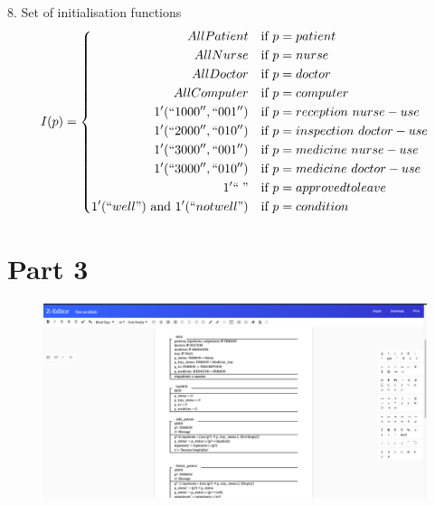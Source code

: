 \documentclass{article}
\begin{document}
8. Set of initialisation functions
$$  
I(p)=\left\{
\begin{aligned}
AllPatient \quad &\mbox{if}\ p=patient\\
AllNurse \quad &\mbox{if}\ p=nurse\\
AllDoctor \quad &\mbox{if}\ p=doctor\\
AllComputer \quad &\mbox{if}\ p=computer\\
1^{\prime}(``1000'',``001'') \quad &\mbox{if}\ p=reception\ nurse-use\\
1^{\prime}(``2000'',``010'') \quad &\mbox{if}\ p=inspection\ doctor-use\\
1^{\prime}(``3000'',``001'') \quad &\mbox{if}\ p=medicine\ nurse-use\\
1^{\prime}(``3000'',``010'') \quad &\mbox{if}\ p=medicine\ doctor-use\\
1^{\prime}``\; " \quad &\mbox{if}\ p=approved to leave\\
1^{\prime}(``well")\ \mbox{and}\ 1^{\prime}(``not well") \quad &\mbox{if}\ p=condition\\
\end{aligned}
\right.$$

\section{Part 3}
\begin{figure}[H]
  \includegraphics[width=1\textwidth]{Fig3}
\end{figure}
\end{document}
